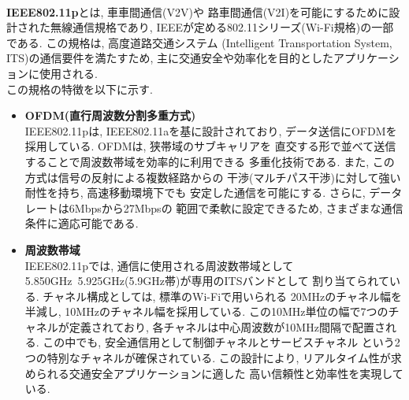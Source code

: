 \\[1em]
\indent \textbf{IEEE802.11p}とは, 車車間通信(V2V)や
路車間通信(V2I)を可能にするために設計された無線通信規格であり, 
IEEEが定める802.11シリーズ(Wi-Fi規格)の一部である. 
この規格は, 高度道路交通システム
(Intelligent Transportation System, ITS)の通信要件を満たすため, 
主に交通安全や効率化を目的としたアプリケーションに使用される.\\
\indent この規格の特徴を以下に示す. 
\begin{itemize}
  \item \textbf{OFDM(直行周波数分割多重方式)}\\
  \indent IEEE802.11pは, IEEE802.11aを基に設計されており, 
  データ送信にOFDMを採用している. OFDMは, 狭帯域のサブキャリアを
  直交する形で並べて送信することで周波数帯域を効率的に利用できる
  多重化技術である. また, この方式は信号の反射による複数経路からの
  干渉(マルチパス干渉)に対して強い耐性を持ち, 高速移動環境下でも
  安定した通信を可能にする. さらに, データレートは6Mbpsから27Mbpsの
  範囲で柔軟に設定できるため, さまざまな通信条件に適応可能である. 
  \item \textbf{周波数帯域}\\
  \indent IEEE802.11pでは, 通信に使用される周波数帯域として
  5.850GHz~5.925GHz(5.9GHz帯)が専用のITSバンドとして
  割り当てられている. チャネル構成としては, 標準のWi-Fiで用いられる
  20MHzのチャネル幅を半減し, 10MHzのチャネル幅を採用している. 
  この10MHz単位の幅で7つのチャネルが定義されており, 
  各チャネルは中心周波数が10MHz間隔で配置される. 
  この中でも, 安全通信用として制御チャネルとサービスチャネル
  という2つの特別なチャネルが確保されている. この設計により, 
  リアルタイム性が求められる交通安全アプリケーションに適した
  高い信頼性と効率性を実現している. 
\end{itemize}
